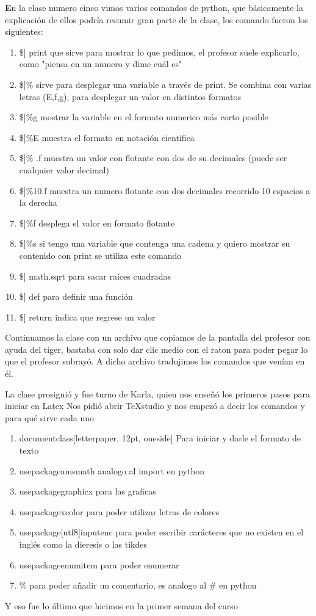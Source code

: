 \documentclass{book}
\begin{document}
\textbf En la clase numero cinco vimos varios comandos de python, que básicamente la explicación de ellos podría resumir gran parte de la clase, los comando fueron los siguientes:
\begin{enumerate}
	\item \$] print que sirve para mostrar lo que pedimos, el profesor suele explicarlo, como "piensa en un numero y dime cuál es"
	\item \$]\% sirve para desplegar una variable a través de print. Se combina con varias letras (E,f,g), para desplegar un valor en distintos formatos
	\item \$]\%g mostrar la variable en el formato numerico más corto posible
	\item \$]\%E muestra el formato en notación cientifica
	\item \$]\% .f muestra un valor con flotante con dos de su decimales (puede ser cualquier valor decimal)
	\item \$]\%10.f muestra un numero flotante con dos decimales recorrido 10 espacios a la derecha
	\item \$]\%f desplega el valor en formato flotante
	\item \$]\%s si tengo una variable que contenga una cadena y quiero mostrar su contenido con print se utiliza este comando
	\item \$] math.sqrt para sacar raíces cuadradas
	\item \$] def para definir una función
	\item \$] return indica que regrese un valor
\end{enumerate}
Continuamos la clase con un archivo que copiamos de la pantalla del profesor con ayuda del tiger, bastaba con solo dar clic medio con el raton para poder pegar lo que el profesor subrayó. A dicho archivo tradujimos los comandos que venían en él.


La clase prosiguió y fue turno de Karla, quien nos enseñó los primeros pasos para iniciar en Latex
Nos pidió abrir TeXstudio
y nos empezó a decir los comandos y para qué sirve cada uno
\begin{enumerate}
	\item documentclass[letterpaper, 12pt, oneside] Para iniciar y darle el formato de texto
	\item usepackage{amsmath} analogo al import en python
	\item usepackage{graphicx} para las graficas 
	\item usepackage{xcolor} para poder utilizar letras de colores
	\item usepackage[utf8]{inputenc} para poder escribir carácteres que no existen en el inglés como la dieresis o las tikdes
	\item usepackage{enumitem} para poder enumerar 
	\item \% para poder añadir un comentario, es analogo al \# en python
\end{enumerate}
Y eso fue lo último que hicimos en la primer semana del curso
\end{document}
